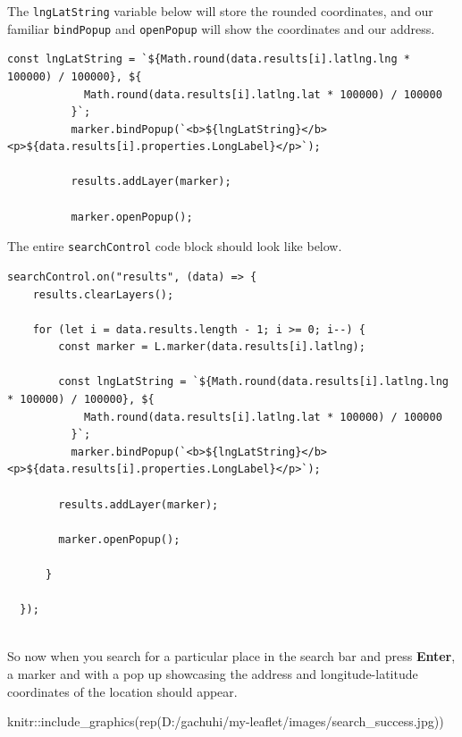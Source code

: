 \documentclass[
]{book}
\newenvironment{Shaded}{\begin{snugshade}}{\end{snugshade}}
\newcommand{\FunctionTok}[1]{\textcolor[rgb]{0.00,0.00,0.00}{#1}}
\newcommand{\NormalTok}[1]{#1}
\newcommand{\SpecialCharTok}[1]{\textcolor[rgb]{0.00,0.00,0.00}{#1}}
\newcommand{\StringTok}[1]{\textcolor[rgb]{0.31,0.60,0.02}{#1}}
\begin{document}
The \texttt{lngLatString} variable below will store the rounded coordinates, and our familiar \texttt{bindPopup} and \texttt{openPopup} will show the coordinates and our address.

\begin{verbatim}
const lngLatString = `${Math.round(data.results[i].latlng.lng * 100000) / 100000}, ${
            Math.round(data.results[i].latlng.lat * 100000) / 100000
          }`;
          marker.bindPopup(`<b>${lngLatString}</b><p>${data.results[i].properties.LongLabel}</p>`);

          results.addLayer(marker);

          marker.openPopup();
\end{verbatim}

The entire \texttt{searchControl} code block should look like below.

\begin{verbatim}
searchControl.on("results", (data) => {
    results.clearLayers();

    for (let i = data.results.length - 1; i >= 0; i--) {
        const marker = L.marker(data.results[i].latlng);

        const lngLatString = `${Math.round(data.results[i].latlng.lng * 100000) / 100000}, ${
            Math.round(data.results[i].latlng.lat * 100000) / 100000
          }`;
          marker.bindPopup(`<b>${lngLatString}</b><p>${data.results[i].properties.LongLabel}</p>`);

        results.addLayer(marker);

        marker.openPopup();

      }

  });
  
\end{verbatim}

So now when you search for a particular place in the search bar and press \textbf{Enter}, a marker and with a pop up showcasing the address and longitude-latitude coordinates of the location should appear.

\begin{Shaded}
\begin{Highlighting}[]
\NormalTok{knitr}\SpecialCharTok{::}\FunctionTok{include\_graphics}\NormalTok{(}\FunctionTok{rep}\NormalTok{(}\StringTok{\textquotesingle{}D:/gachuhi/my{-}leaflet/images/search\_success.jpg\textquotesingle{}}\NormalTok{))}
\end{Highlighting}
\end{Shaded}
\end{document}
